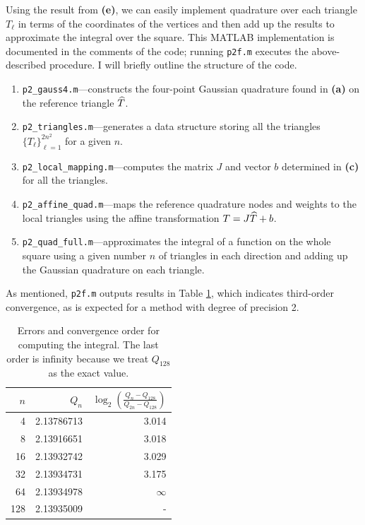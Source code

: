 \documentclass{homework}
\begin{document}
\begin{alphaparts}
		\questionpart Using the result from \textbf{(e)}, we can easily implement quadrature over each triangle $T_\ell$ in terms of the coordinates of the vertices and then add up the results to approximate the integral over the square. This MATLAB implementation is documented in the comments of the code; running \texttt{p2f.m} executes the above-described procedure. I will briefly outline the structure of the code.
		\begin{enumerate}
			\item \texttt{p2\_gauss4.m}---constructs the four-point Gaussian quadrature found in \textbf{(a)} on the reference triangle $\widehat{T}$.
			\item \texttt{p2\_triangles.m}---generates a data structure storing all the triangles $\{T_\ell\}_{\ell=1}^{2n^2}$ for a given $n$.
			\item \texttt{p2\_local\_mapping.m}---computes the matrix $J$ and vector $b$ determined in \textbf{(c)} for all the triangles.
			\item \texttt{p2\_affine\_quad.m}---maps the reference quadrature nodes and weights to the local triangles using the affine transformation $T = J\widehat{T} + b$.
			\item \texttt{p2\_quad\_full.m}---approximates the integral of a function on the whole square using a given number $n$ of triangles in each direction and adding up the Gaussian quadrature on each triangle.
		\end{enumerate}
		As mentioned, \texttt{p2f.m} outputs results in Table \ref{table:p2f}, which indicates third-order convergence, as is expected for a method with degree of precision 2.
		\begin{table}[htb!]
			\centering
			\begin{tabular}{@{}rrr@{}}
				\toprule
				$n$ & $Q_{n}$ & $\log_2\left(\frac{Q_n - Q_{128}}{Q_{2n} - Q_{128}}\right)$ \\
				\midrule
				  4  &   2.13786713  &   3.014 \\
				8    & 2.13916651   &  3.018 \\
				16   &  2.13932742  &   3.029 \\
				32   &  2.13934731  &   3.175 \\
				64   &  2.13934978  &   $\infty$ \\
				128  &   2.13935009 & -\\
				\bottomrule
			\end{tabular}
			\caption{Errors and convergence order for computing the integral. The last order is infinity because we treat $Q_{128}$ as the exact value.}
			\label{table:p2f}
		\end{table}
	\end{alphaparts}
	
\end{document}
